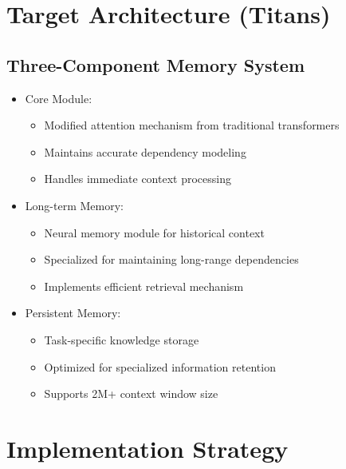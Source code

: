 \documentclass{article}
\begin{document}
\section{Target Architecture (Titans)}
\subsection{Three-Component Memory System}
\begin{itemize}
    \item Core Module:
    \begin{itemize}
        \item Modified attention mechanism from traditional transformers
        \item Maintains accurate dependency modeling
        \item Handles immediate context processing
    \end{itemize}
    \item Long-term Memory:
    \begin{itemize}
        \item Neural memory module for historical context
        \item Specialized for maintaining long-range dependencies
        \item Implements efficient retrieval mechanism
    \end{itemize}
    \item Persistent Memory:
    \begin{itemize}
        \item Task-specific knowledge storage
        \item Optimized for specialized information retention
        \item Supports 2M+ context window size
    \end{itemize}
\end{itemize}

\section{Implementation Strategy}
\end{document}
